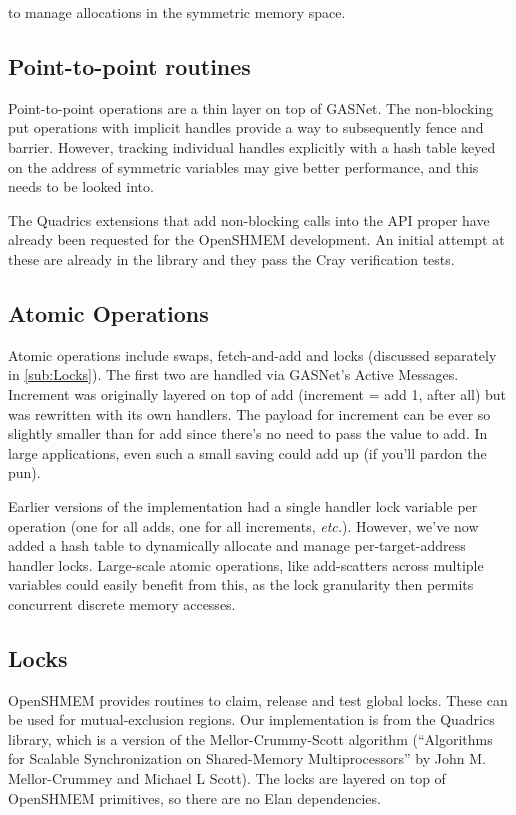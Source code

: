 \documentclass[english]{article}
\begin{document}
to manage allocations in the symmetric memory space.


\subsection{Point-to-point routines}

Point-to-point operations are a thin layer on top of GASNet. The non-blocking
put operations with implicit handles provide a way to subsequently
fence and barrier. However, tracking individual handles explicitly
with a hash table keyed on the address of symmetric variables may
give better performance, and this needs to be looked into.

The Quadrics extensions that add non-blocking calls into the API proper
have already been requested for the OpenSHMEM development. An initial
attempt at these are already in the library and they pass the Cray
verification tests.


\subsection{Atomic Operations}

Atomic operations include swaps, fetch-and-add and locks (discussed
separately in \ref{sub:Locks}). The first two are handled via GASNet's
Active Messages. Increment was originally layered on top of add (increment
= add 1, after all) but was rewritten with its own handlers. The payload
for increment can be ever so slightly smaller than for add since there's
no need to pass the value to add. In large applications, even such
a small saving could add up (if you'll pardon the pun).

Earlier versions of the implementation had a single handler lock variable
per operation (one for all adds, one for all increments, \emph{etc.}).
However, we've now added a hash table to dynamically allocate and
manage per-target-address handler locks. Large-scale atomic operations,
like add-scatters across multiple variables could easily benefit from
this, as the lock granularity then permits concurrent discrete memory
accesses.


\subsection{\label{sub:Locks}Locks}

OpenSHMEM provides routines to claim, release and test global locks.
These can be used for mutual-exclusion regions. Our implementation
is from the Quadrics library, which is a version of the Mellor-Crummy-Scott
algorithm ({}``Algorithms for Scalable Synchronization on Shared-Memory
Multiprocessors'' by John M. Mellor-Crummey and Michael L Scott).
The locks are layered on top of OpenSHMEM primitives, so there are
no Elan dependencies.
\end{document}

